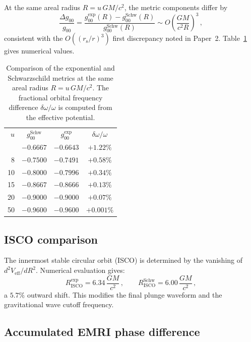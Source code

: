 \documentclass[prl,twocolumn,superscriptaddress,longbibliography]{revtex4-2}
\newcommand{\rs}{r_{\mathrm{s}}}
\begin{document}
At the same areal radius $R = u\,GM/c^2$, the metric
components differ by
\begin{equation}
  \frac{\Delta g_{00}}{g_{00}}
  = \frac{g_{00}^{\mathrm{exp}}(R) - g_{00}^{\mathrm{Schw}}(R)}
         {g_{00}^{\mathrm{Schw}}(R)}
  \sim O\!\left(\frac{GM}{c^2 R}\right)^{\!3}\,,
  \label{eq:delta_g00}
\end{equation}
consistent with the $O((\rs/r)^3)$ first discrepancy noted
in Paper~2.  Table~\ref{tab:metric} gives numerical values.

\begin{table}[t]
\caption{\label{tab:metric}%
Comparison of the exponential and Schwarzschild metrics at the
same areal radius $R = u\,GM/c^2$.  The fractional orbital
frequency difference $\delta\omega/\omega$ is computed from the
effective potential.}
\begin{ruledtabular}
\begin{tabular}{rccc}
  $u$ & $g_{00}^{\mathrm{Schw}}$ & $g_{00}^{\mathrm{exp}}$
    & $\delta\omega/\omega$ \\
  \colrule
  6   & $-0.6667$ & $-0.6643$ & $+1.22\%$ \\
  8   & $-0.7500$ & $-0.7491$ & $+0.58\%$ \\
  10  & $-0.8000$ & $-0.7996$ & $+0.34\%$ \\
  15  & $-0.8667$ & $-0.8666$ & $+0.13\%$ \\
  20  & $-0.9000$ & $-0.9000$ & $+0.07\%$ \\
  50  & $-0.9600$ & $-0.9600$ & $+0.001\%$ \\
\end{tabular}
\end{ruledtabular}
\end{table}

\subsection{ISCO comparison}

The innermost stable circular orbit (ISCO) is determined by
the vanishing of $d^2 V_{\mathrm{eff}}/dR^2$.  Numerical
evaluation gives:
\begin{equation}
  R_{\mathrm{ISCO}}^{\mathrm{exp}} = 6.34\,\frac{GM}{c^2}\,,
  \qquad
  R_{\mathrm{ISCO}}^{\mathrm{Schw}} = 6.00\,\frac{GM}{c^2}\,,
\end{equation}
a $5.7\%$ outward shift.  This modifies the final plunge
waveform and the gravitational wave cutoff frequency.

\subsection{Accumulated EMRI phase difference}
\end{document}
